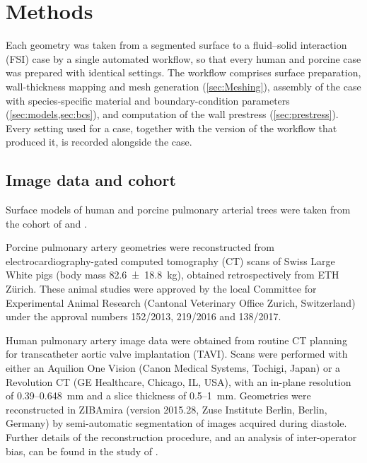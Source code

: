 \section{Methods}\label{sec:methods}

Each geometry was taken from a segmented surface to a fluid--solid interaction (FSI) case by a single automated workflow, so that every human and porcine case was prepared with identical settings.
The workflow comprises surface preparation, wall-thickness mapping and mesh generation (\cref{sec:Meshing}), assembly of the case with species-specific material and boundary-condition parameters (\cref{sec:models,sec:bcs}), and computation of the wall prestress (\cref{sec:prestress}).
Every setting used for a case, together with the version of the workflow that produced it, is recorded alongside the case.

\subsection{Image data and cohort}\label{sec:cohort}

Surface models of  human and  porcine pulmonary arterial trees were taken from the cohort of \citet{yevtushenkoSimulationBasedComparisonHuman2025} and \citet{goubergrits2023ctbased}.

Porcine pulmonary artery geometries were reconstructed from electrocardiography-gated computed tomography (CT) scans of Swiss Large White pigs (body mass \SI{82.6 \pm 18.8}{\kilo\gram}), obtained retrospectively from ETH Zürich.
These animal studies were approved by the local Committee for Experimental Animal Research (Cantonal Veterinary Office Zurich, Switzerland) under the approval numbers 152/2013, 219/2016 and 138/2017.

Human pulmonary artery image data were obtained from routine CT planning for transcatheter aortic valve implantation (TAVI).
Scans were performed with either an Aquilion One Vision (Canon Medical Systems, Tochigi, Japan) or a Revolution CT (GE Healthcare, Chicago, IL, USA), with an in-plane resolution of 0.39--\SI{0.648}{\milli\metre} and a slice thickness of 0.5--\SI{1}{\milli\metre}.
Geometries were reconstructed in ZIBAmira (version 2015.28, Zuse Institute Berlin, Berlin, Germany) by semi-automatic segmentation of images acquired during diastole.
Further details of the reconstruction procedure, and an analysis of inter-operator bias, can be found in the study of \citet{goubergrits2023ctbased}.


